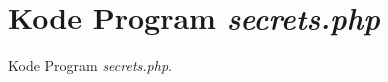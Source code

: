 \chapter{Kode Program \textit{secrets.php}}
\label{lamp:kodeprogramsecrets}

Kode Program \textit{secrets.php}.
 